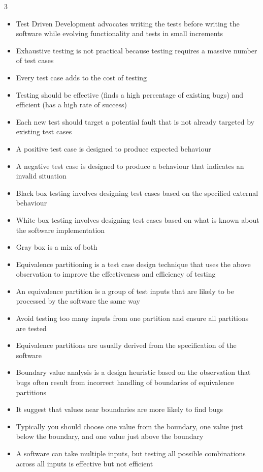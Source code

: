 \documentclass[10pt, landscape]{article}
\begin{document}
\begin{multicols*}{3}
\begin{itemize}
    \item Test Driven Development advocates writing the tests before writing the software while evolving functionality and tests in small increments
    \item Exhaustive testing is not practical because testing requires a massive number of test cases
    \item Every test case adds to the cost of testing
    \item Testing should be effective (finds a high percentage of existing bugs) and efficient (has a high rate of success)
    \item Each new test should target a potential fault that is not already targeted by existing test cases
    \item A positive test case is designed to produce expected behaviour
    \item A negative test case is designed to produce a behaviour that indicates an invalid situation
    \item Black box testing involves designing test cases based on the specified external behaviour
    \item White box testing involves designing test cases based on what is known about the software implementation
    \item Gray box is a mix of both
    \item Equivalence partitioning is a test case design technique that uses the above observation to improve the effectiveness and efficiency of testing
    \item An equivalence partition is a group of test inputs that are likely to be processed by the software the same way
    \item Avoid testing too many inputs from one partition and ensure all partitions are tested
    \item Equivalence partitions are usually derived from the specification of the software
    \item Boundary value analysis is a design heuristic based on the observation that bugs often result from incorrect handling of boundaries of equivalence partitions
    \item It suggest that values near boundaries are more likely to find bugs
    \item Typically you should choose one value from the boundary, one value just below the boundary, and one value just above the boundary
    \item A software can take multiple inputs, but testing all possible combinations across all inputs is effective but not efficient

\end{itemize}
\end{multicols*}
\end{document}
